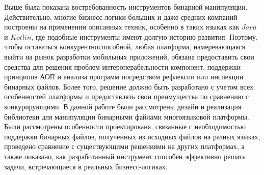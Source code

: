 Выше была показана востребованность инструментов бинарной манипуляции. Действительно, многие бизнесс-логики больших и даже средних компаний построены на применении описанных техник, особенно в таких языках как $Java$ и $Kotlin$, где подобные инструменты имеют долгую историю развития. Поэтому, чтобы оставаться конкурентноспособной, любая платформа, намеревающаяся выйти на рынок разработки мобильных приложений, обязана предоставить свои средства для решения проблем интероперабельности компонент, поддержки принципов АОП и анализа программ посредством рефлексии или инспекции бинарных файлов. Более того, решение должно быть разработано с учетом всех особенностей платформы и предоставлять свои преимущества по сравнению с конкурирующими. В данной работе были рассмотрены дизайн и реализация библиотеки для манипуляции бинарными файлами многоязыковой платформы. Были рассмотрены особенности проектированя, связанные с необходимостью поддержки бинарных файлов, полученных из исходных файлов на разных языках, проведено сравнение с существующими решениями на других платформах, а также показано, как разработанный инструмент способен эффективно решать задачи, встречающиеся в реальных бизнесс-логиках.

\newpage

